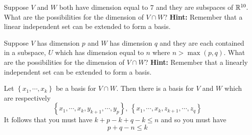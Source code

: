 \begin{enumialphparenastyle}
\begin{ex} Suppose $V$ and $W$ both have dimension equal to $7$ and they are
subspaces of $\mathbb{R}^{10}.$ What are the possibilities for the dimension
of $V\cap W$? \textbf{Hint: }Remember that a linear independent set can be
extended to form a basis. \vspace{1mm}
\end{ex}

\begin{ex} Suppose $V$ has dimension $p$ and $W$ has dimension $q$ and they
are each contained in a subspace, $U$ which has dimension equal to $n$ where 
$n>\max \left( p,q\right) .$ What are the possibilities for the dimension of 
$V\cap W$? \textbf{Hint: }Remember that a linearly independent set can be
extended to form a basis. \vspace{1mm}
\begin{sol}
Let $\left\{ x_{1},\cdots ,x_{k}\right\} $ be a
basis for $V\cap W.$ Then there is a basis for $V$ and $W$ which are
respectively
\[
\left\{ x_{1},\cdots ,x_{k},y_{k+1},\cdots ,y_{p}\right\} ,\ \left\{
x_{1},\cdots ,x_{k},z_{k+1},\cdots ,z_{q}\right\}
\]
It follows that you must have $k+p-k+q-k\leq n$ and so you must have
\[
p+q-n\leq k
\]
\end{sol}
\end{ex}


\end{enumialphparenastyle}
